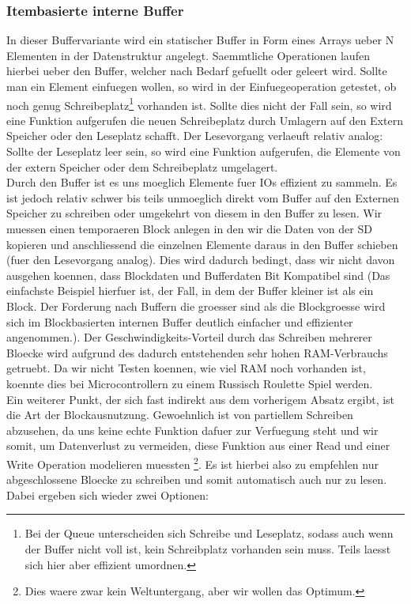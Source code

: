 \documentclass[10pt,a4paper]{article}
\begin{document}
\subsubsection{Itembasierte interne Buffer}
In dieser Buffervariante wird ein statischer Buffer in Form eines Arrays ueber N Elementen in der Datenstruktur angelegt. Saemmtliche Operationen laufen hierbei ueber den Buffer, welcher nach Bedarf gefuellt oder geleert wird. Sollte man ein Element einfuegen wollen, so wird in der Einfuegeoperation getestet, ob noch genug Schreibeplatz\footnote{Bei der Queue unterscheiden sich Schreibe und Leseplatz, sodass auch wenn der Buffer nicht voll ist, kein Schreibplatz vorhanden sein muss. Teils laesst sich hier aber effizient umordnen.} vorhanden ist. Sollte dies nicht der Fall sein, so wird eine Funktion aufgerufen die neuen Schreibeplatz durch Umlagern auf den Extern Speicher oder den Leseplatz schafft. Der Lesevorgang verlaeuft relativ analog: Sollte der Leseplatz leer sein, so wird eine Funktion aufgerufen, die Elemente von der extern Speicher oder dem Schreibeplatz umgelagert.\\
Durch den Buffer ist es uns moeglich Elemente fuer IOs effizient zu sammeln. Es ist jedoch relativ schwer bis teils unmoeglich direkt vom Buffer auf den Externen Speicher zu schreiben oder umgekehrt von diesem in den Buffer zu lesen. Wir muessen einen temporaeren Block anlegen in den wir die Daten von der SD kopieren und anschliessend die einzelnen Elemente daraus in den Buffer schieben (fuer den Lesevorgang analog). Dies wird dadurch bedingt, dass wir nicht davon ausgehen koennen, dass Blockdaten und Bufferdaten Bit Kompatibel sind (Das einfachste Beispiel hierfuer ist, der Fall, in dem der Buffer kleiner ist als ein Block. Der Forderung nach Buffern die groesser sind als die Blockgroesse wird sich im Blockbasierten internen Buffer deutlich einfacher und effizienter angenommen.). Der Geschwindigkeits-Vorteil durch das Schreiben mehrerer Bloecke wird aufgrund des dadurch entstehenden sehr hohen RAM-Verbrauchs getruebt. Da wir nicht Testen koennen, wie viel RAM noch vorhanden ist, koennte dies bei Microcontrollern zu einem Russisch Roulette Spiel werden.\\
Ein weiterer Punkt, der sich fast indirekt aus dem vorherigem Absatz ergibt, ist die Art der Blockausnutzung. Gewoehnlich ist von partiellem Schreiben abzusehen, da uns keine echte Funktion dafuer zur Verfuegung steht und wir somit, um Datenverlust zu vermeiden, diese Funktion aus einer Read und einer Write Operation modelieren muessten \footnote{Dies waere zwar kein Weltuntergang, aber wir wollen das Optimum.}. Es ist hierbei also zu empfehlen nur abgeschlossene Bloecke zu schreiben und somit automatisch auch nur zu lesen. Dabei ergeben sich wieder zwei Optionen: 
\end{document}
